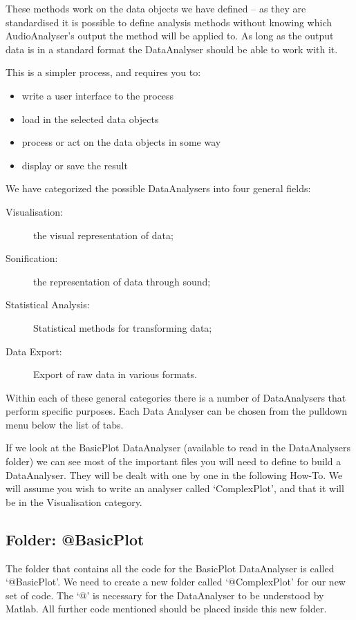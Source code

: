 \documentclass{article}
\begin{document}
These methods work on the data objects we have defined -- as they are standardised it is possible to define analysis methods without knowing which AudioAnalyser's output the method will be applied to. As long as the output data is in a standard format the DataAnalyser should be able to work with it.

This is a simpler process, and requires you to:

\begin{itemize}
	\item write a user interface to the process
	\item load in the selected data objects
	\item process or act on the data objects in some way
	\item display or save the result
\end{itemize}

We have categorized the possible DataAnalysers into four general fields: 
\begin{description}
\item[Visualisation:] the visual representation of data;
\item[Sonification:] the representation of data through sound;
\item[Statistical Analysis:] Statistical methods for transforming data; 
\item[Data Export:] Export of raw data in various formats.
\end{description}

Within each of these general categories there is a number of DataAnalysers that perform specific purposes. Each Data Analyser can be chosen from the pulldown menu below the list of tabs. 

If we look at the BasicPlot DataAnalyser (available to read in the DataAnalysers folder) we  can see most of the important files you will need to define to build a DataAnalyser. They will be dealt with one by one in the following How-To. We will assume you wish to write an analyser called `ComplexPlot', and that it will be in the Visualisation category. 

\subsection{Folder: @BasicPlot}

The folder that contains all the code for the BasicPlot DataAnalyser is called  `@BasicPlot'. We need to create a new folder called `@ComplexPlot' for our new set of code. The `@' is necessary for the DataAnalyser to be understood by Matlab. All further code mentioned should be placed inside this new folder. 
\end{document}
